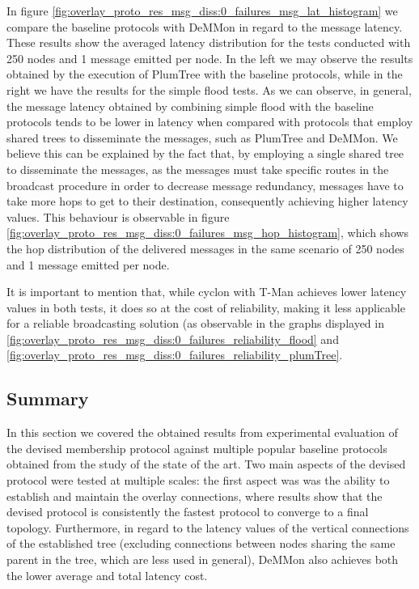 In figure \ref{fig:overlay_proto_res_msg_diss:0_failures_msg_lat_histogram} we compare the baseline protocols with DeMMon in regard to the message latency. These results show the averaged latency distribution for the tests conducted with 250 nodes and 1 message emitted per node. In the left we may observe the results obtained by the execution of PlumTree with the baseline protocols, while in the right we have the results for the simple flood tests. As we can observe, in general, the message latency obtained by combining simple flood with the baseline protocols tends to be lower in latency when compared with protocols that employ shared trees to disseminate the messages, such as PlumTree and DeMMon. We believe this can be explained by the fact that, by employing a single shared tree to disseminate the messages, as the messages must take specific routes in the broadcast procedure in order to decrease message redundancy, messages have to take more hops to get to their destination, consequently achieving higher latency values. This behaviour is observable in figure \ref{fig:overlay_proto_res_msg_diss:0_failures_msg_hop_histogram}, which shows the hop distribution of the delivered messages in the same scenario of 250 nodes and 1 message emitted per node.

It is important to mention that, while cyclon with T-Man achieves lower latency values in both tests, it does so at the cost of reliability, making it less applicable for a reliable broadcasting solution (as observable in the graphs displayed in \ref{fig:overlay_proto_res_msg_diss:0_failures_reliability_flood} and \ref{fig:overlay_proto_res_msg_diss:0_failures_reliability_plumTree}.


\subsection{Summary}

In this section we covered the obtained results from experimental evaluation of the devised membership protocol against multiple popular baseline protocols obtained from the study of the state of the art. Two main aspects of the devised protocol were tested at multiple scales: the first aspect was was the ability to establish and maintain the overlay connections, where results show that the devised protocol is consistently the fastest protocol to converge to a final topology. Furthermore, in regard to the latency values of the vertical connections of the established tree (excluding connections between nodes sharing the same parent in the tree, which are less used in general), DeMMon also achieves both the lower average and total latency cost.

